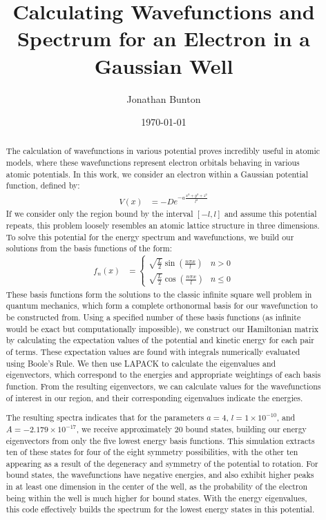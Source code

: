 \documentclass[12pt]{article}
\author{Jonathan Bunton}
\title{Calculating Wavefunctions and Spectrum for an Electron in a Gaussian Well}
\date{\today}
\begin{document}
\maketitle
\onehalfspacing
\begin{abstract}
The calculation of wavefunctions in various potential proves incredibly useful in atomic models, where these wavefunctions represent electron orbitals behaving in various atomic potentials.  In this work, we consider an electron within a Gaussian potential function, defined by:
\begin{align}
\label{potentialeq}
V(x) &= -De^{-a\frac{x^2+y^2+z^2}{l^2}}
\end{align}
If we consider only the region bound by the interval $[-l,l]$ and assume this potential repeats, this problem loosely resembles an atomic lattice structure in three dimensions.  To solve this potential for the energy spectrum and wavefunctions, we build our solutions from the basis functions of the form:
\begin{align}
\label{basis}
f_n(x) &= \begin{cases}
\sqrt{\frac{L}{2}}\sin\left(\frac{n\pi x}{l}\right) & n > 0\\
\sqrt{\frac{L}{2}}\cos\left(\frac{n\pi x}{l}\right) & n \leq 0
\end{cases}
\end{align}
These basis functions form the solutions to the classic infinite square well problem in quantum mechanics, which form a complete orthonormal basis for our wavefunction to be constructed from.  Using a specified number of these basis functions (as infinite would be exact but computationally impossible), we construct our Hamiltonian matrix by calculating the expectation values of the potential and kinetic energy for each pair of terms.  These expectation values are found with integrals numerically evaluated using Boole's Rule. \cite{boolesrule}  We then use LAPACK to calculate the eigenvalues and eigenvectors, which correspond to the energies and appropriate weightings of each basis function. \cite{LAPACK} From the resulting eigenvectors, we can calculate values for the wavefunctions of interest in our region, and their corresponding eigenvalues indicate the energies. \cite{quantum}

The resulting spectra indicates that for the parameters $a = 4$, $l = 1\times 10^{-10}$, and $A = -2.179\times 10^{-17}$, we receive approximately 20 bound states, building our energy eigenvectors from only the five lowest energy basis functions. This simulation extracts ten of these states for four of the eight symmetry possibilities, with the other ten appearing as a result of the degeneracy and symmetry of the potential to rotation.  For bound states, the wavefunctions have negative energies, and also exhibit higher peaks in at least one dimension in the center of the well, as the probability of the electron being within the well is much higher for bound states.  With the energy eigenvalues, this code effectively builds the spectrum for the lowest energy states in this potential.
\end{abstract}
\end{document}
